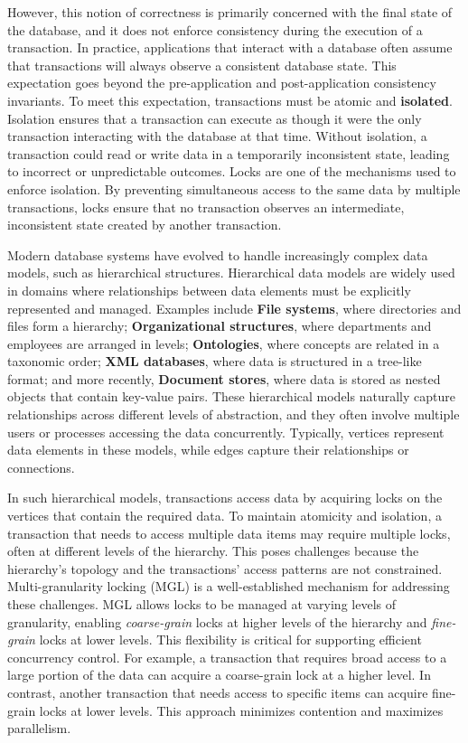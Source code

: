 However, this notion of correctness is primarily concerned with the final state of the database, and it does not enforce consistency during the execution of a transaction. In practice, applications that interact with a database often assume that transactions will always observe a consistent database state. This expectation goes beyond the pre-application and post-application consistency invariants. To meet this expectation, transactions must be atomic and \textbf{isolated}. Isolation ensures that a transaction can execute as though it were the only transaction interacting with the database at that time. Without isolation, a transaction could read or write data in a temporarily inconsistent state, leading to incorrect or unpredictable outcomes. Locks are one of the mechanisms used to enforce isolation. By preventing simultaneous access to the same data by multiple transactions, locks ensure that no transaction observes an intermediate, inconsistent state created by another transaction.

Modern database systems have evolved to handle increasingly complex data models, such as hierarchical structures. Hierarchical data models are widely used in domains where relationships between data elements must be explicitly represented and managed. Examples include \textbf{File systems}, where directories and files form a hierarchy; \textbf{Organizational structures}, where departments and employees are arranged in levels; \textbf{Ontologies}, where concepts are related in a taxonomic order; \textbf{XML databases}, where data is structured in a tree-like format; and more recently, \textbf{Document stores}, where data is stored as nested objects that contain key-value pairs. These hierarchical models naturally capture relationships across different levels of abstraction, and they often involve multiple users or processes accessing the data concurrently. Typically, vertices represent data elements in these models, while edges capture their relationships or connections.

In such hierarchical models, transactions access data by acquiring locks on the vertices that contain the required data. To maintain atomicity and isolation, a transaction that needs to access multiple data items may require multiple locks, often at different levels of the hierarchy. This poses challenges because the hierarchy's topology and the transactions' access patterns are not constrained. Multi-granularity locking (MGL) is a well-established mechanism for addressing these challenges. MGL allows locks to be managed at varying levels of granularity, enabling \emph{coarse-grain} locks at higher levels of the hierarchy and \emph{fine-grain} locks at lower levels. This flexibility is critical for supporting efficient concurrency control. For example, a transaction that requires broad access to a large portion of the data can acquire a coarse-grain lock at a higher level. In contrast, another transaction that needs access to specific items can acquire fine-grain locks at lower levels. This approach minimizes contention and maximizes parallelism.

